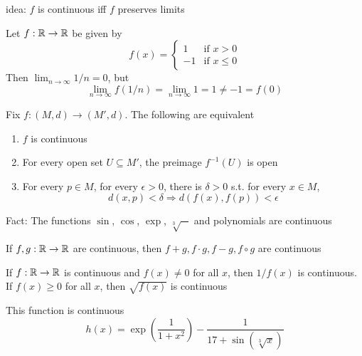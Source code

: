 \documentclass[11pt]{article}
\begin{document}
idea: \(f\) is continuous iff \(f\) preserves limits

\begin{examplle}[]
Let \(f:\mathbb{R}\to\mathbb{R}\) be given by
\begin{equation*}
f(x)=
\begin{cases}
1&\text{if }x>0\\
-1&\text{if }x\le 0
\end{cases}
\end{equation*}
Then \(\lim_{n\to\infty}1/n=0\), but
\begin{equation*}
\lim_{n\to\infty}f(1/n)=\lim_{n\to\infty}1=1\neq-1=f(0)
\end{equation*}
\end{examplle}

\begin{proposition}[]
Fix \(f:(M,d)\to(M',d)\). The following are equivalent
\begin{enumerate}
\item \(f\) is continuous
\item For every open set \(U\subseteq M'\), the preimage \(f^{-1}(U)\) is open
\item For every \(p\in M\), for every \(\epsilon>0\), there is \(\delta>0\) s.t. for every \(x\in M\),
 \begin{equation*}
d(x,p)<\delta\Rightarrow d(f(x),f(p))<\epsilon
 \end{equation*}
\end{enumerate}
\end{proposition}

Fact: The functions \(\sin\), \(\cos\), \(\exp\), \(\sqrt[3]{-}\) and polynomials are continuous

\begin{proposition}[]
If \(f,g:\mathbb{R}\to\mathbb{R}\) are continuous, then \(f+g,f\cdot g,f-g,f\circ g\) are continuous
\end{proposition}

\begin{proposition}[]
If \(f:\mathbb{R}\to\mathbb{R}\) is continuous and \(f(x)\neq 0\) for all \(x\), then \(1/f(x)\) is continuous.
If \(f(x)\ge 0\) for all \(x\), then \(\sqrt{f(x)}\) is continuous
\end{proposition}

\begin{examplle}[]
This function is continuous
\begin{equation*}
h(x)=\exp\left( \frac{1}{1+x^2} \right)-\frac{1}{17+\sin(\sqrt[3]{x})}
\end{equation*}
\end{examplle}
\end{document}
